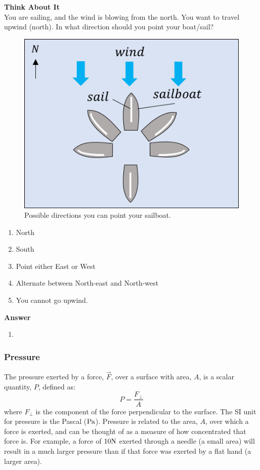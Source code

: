 \begin{framed}
\textbf{Think About It}\\
You are sailing, and the wind is blowing from the north. You want to travel upwind (north). In what direction should you point your boat/sail?

\begin{figure}[!htbp]
\centering
\includegraphics[width=0.4\linewidth]{files/sailboat-73ba0d86d51e365ea42104d9fe2d8ba9.png}
\caption[]{Possible directions you can point your sailboat.}
\label{fig:fluidmechanics:sailboat}
\end{figure}

\begin{enumerate}
\item North
\item South
\item Point either East or West
\item Alternate between North-east and North-west
\item You cannot go upwind.
\end{enumerate}

\begin{framed}
\textbf{Answer}\\
\begin{enumerate}[resume]
\item
\end{enumerate}
\end{framed}
\end{framed}

\subsubsection{Pressure}

The pressure exerted by a force, $\vec F$, over a surface with area, $A$, is a scalar quantity, $P$, defined as:
\begin{equation}
P=\frac{F_\perp}{A}
\end{equation}
where $F_\perp$ is the component of the force perpendicular to the surface. The SI unit for pressure is the Pascal (${\rm Pa}$). Pressure is related to the area, $A$, over which a force is exerted, and can be thought of as a measure of how concentrated that force is. For example, a force of $10 {\rm N}$ exerted through a needle (a small area) will result in a much larger pressure than if that force was exerted by a flat hand (a larger area).

